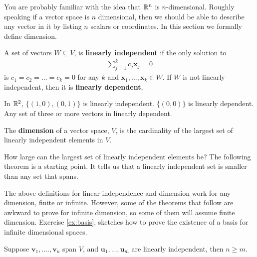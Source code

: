 You are probably familiar with the idea that $\mathbb{R}^n$ is
$n$-dimensional. Roughly speaking if a vector space is $n$
dimensional, then we should be able to describe any vector in it by
listing $n$ scalars or coordinates.  In this section we formally
define dimension.
\begin{definition}
  A set of vectors $W \subseteq V$, is \textbf{linearly
    independent} if the only solution to
  \begin{align*}
    \sum_{j=1}^k c_j \mathbf{x}_j = 0 
  \end{align*}
  is $c_1 = c_2 = ... = c_k = 0$ for any $k$ and $\mathbf{x}_1, ...,
  \mathbf{x}_k \in W$. If $W$ is not linearly independent, then it is
  \textbf{linearly dependent},
\end{definition}
\begin{example}
  In $\mathbb{R}^2$, $\{(1,0), (0,1)\}$ is linearly independent. $\{(0,0)\}$
  is linearly dependent. Any set of three or more vectors in linearly
  dependent. 
\end{example}
\begin{definition}
  The \textbf{dimension} of a vector space, $V$, is the cardinality of
  the largest set of linearly independent elements in $V$.
\end{definition} 
How large can the largest set of linearly independent elements be? The
following theorem is a starting point. It tells us that a linearly
independent set is smaller than any set that spans. 
\begin{remark}
  The above definitions for linear independence and dimension work for
  any dimension, finite or infinite. However, some of the theorems
  that follow are awkward to prove for infinite dimension, so some of
  them will assume finite dimension. Exercise \ref{ex:basis}, sketches
  how to prove the existence of a basis for infinite dimensional
  spaces. 
\end{remark}
\begin{theorem}\label{thm:spanLin}
  Suppose $\mathbf{v}_1, ...., \mathbf{v}_n$ span $V$, and 
  $\mathbf{u}_1, ..., \mathbf{u}_m$ are linearly independent, then  $n
  \geq m$. 
\end{theorem}
